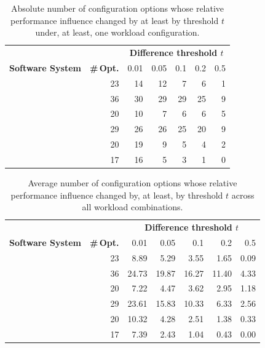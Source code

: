 \begin{table}
	\footnotesize
	\centering
	\caption{Absolute number of configuration options whose relative performance influence changed by at least by threshold $t$ under, at least, one workload configuration.}
	\begin{tabular}{lr|rrrrr}
		\toprule
		& &  \multicolumn{5}{c}{\textbf{Difference threshold $t$}} \\
		\textbf{Software System} & \textbf{\#\,Opt.} & 0.01 &  0.05 &  0.1 &  0.2 &  0.5 \\
		\midrule
		\dconvert & 23 &    14 &    12 &    7 &    6 &    1 \\
		\jumper & 36 &   30 &    29 &   29 &   25 &    9 \\
		\batik &  20 &  10 &     7 &    6 &    6 &    5 \\
		\kanzi & 29 &   26 &    26 &   25 &   20 &    9 \\
		\jadx & 20 &   19 &     9 &    5 &    4 &    2 \\
		\htwo & 17 &   16 &     5 &    3 &    1 &    0 \\
		\bottomrule
	\end{tabular}
	\label{tab:total_changes}
\end{table}
\begin{table}
	\centering\footnotesize
	\caption{Average number of configuration options whose relative performance influence changed by, at least, by threshold $t$ across all workload combinations.}
	\begin{tabular}{lr|rrrrr}
		\toprule
		& & \multicolumn{5}{c}{\textbf{Difference threshold $t$}} \\
		\textbf{Software System} & \textbf{\#\,Opt.} & 0.01 &  0.05 &  0.1 &  0.2 &  0.5 \\
		\midrule
		\dconvert & 23 &  8.89 &  5.29 &  3.55 &  1.65 & 0.09 \\
		\jumper & 36 & 24.73 & 19.87 & 16.27 & 11.40 & 4.33 \\
		\batik & 20 &  7.22 &  4.47 &  3.62 &  2.95 & 1.18 \\
		\kanzi & 29 & 23.61 & 15.83 & 10.33 &  6.33 & 2.56 \\
		\jadx & 20 & 10.32 &  4.28 &  2.51 &  1.38 & 0.33 \\
		\htwo & 17 & 7.39 &  2.43 &  1.04 &  0.43 & 0.00 \\
		\bottomrule
	\end{tabular}
	\label{tab:average_changes}
\end{table}


